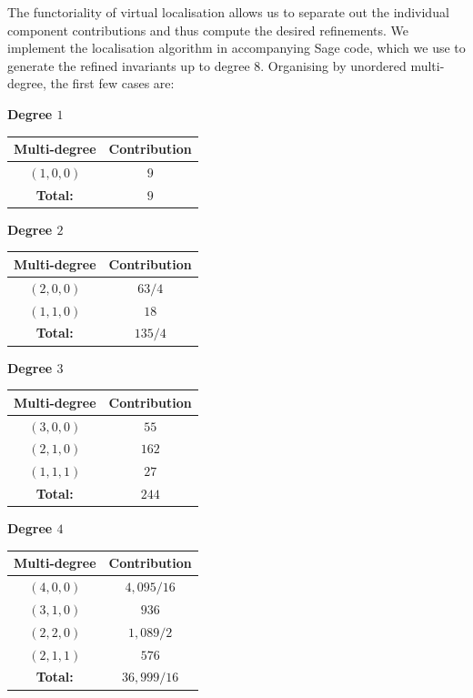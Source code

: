 \documentclass[11pt]{amsart}
\theoremstyle{definition}
\theoremstyle{definition}
\begin{document}
The functoriality of virtual localisation allows us to separate out the individual component contributions and thus compute the desired refinements. We implement the localisation algorithm in accompanying Sage code, which we use to generate the refined invariants up to degree $8$. Organising by unordered multi-degree, the first few cases are:

\begin{center}
\begin{minipage}[t]{0.4\textwidth}
\begin{center}
\noindent \textbf{Degree $1$}\\
\begin{tabular}{| c | c |}
	\hline
	\textbf{Multi-degree} & \textbf{Contribution} \\
	\hline \hline
	$(1,0,0)$ & $9$ \\
	\hline \hline
	\textbf{Total:} & $9$ \\
	\hline
\end{tabular}\bigskip

\noindent \textbf{Degree $2$}\\
\begin{tabular}{| c | c |}
	\hline
	\textbf{Multi-degree} & \textbf{Contribution} \\
	\hline \hline
	$(2,0,0)$ & $63/4$ \\
	\hline
	$(1,1,0)$ & $18$ \\
	\hline \hline
	\textbf{Total:} & $135/4$ \\
	\hline
\end{tabular}\bigskip

\noindent \textbf{Degree $3$}\\
\begin{tabular}{| c | c |}
	\hline
	\textbf{Multi-degree} & \textbf{Contribution} \\
	\hline \hline
	$(3,0,0)$ & $55$ \\
	\hline
	$(2,1,0)$ & $162$ \\
	\hline 
	$(1,1,1)$ & $27$ \\
	\hline\hline
	\textbf{Total:} & $244$ \\
	\hline
\end{tabular}
\end{center}
\end{minipage}
\begin{minipage}[t]{0.4\textwidth}
\begin{center}
\noindent \textbf{Degree $4$}\\
\begin{tabular}{| c | c |}
	\hline
	\textbf{Multi-degree} & \textbf{Contribution} \\
	\hline \hline
	$(4,0,0)$ & $4,\!095/16$ \\
	\hline
	$(3,1,0)$ &  $936$ \\
	\hline 
	$(2,2,0)$ &  $1,\!089/2$ \\
	\hline
	$(2,1,1)$ & $576$ \\
	\hline\hline
	\textbf{Total:} & $36,\!999/16$ \\
	\hline
\end{tabular}\bigskip


\end{center}
\end{minipage}
\end{center}
\end{document}
